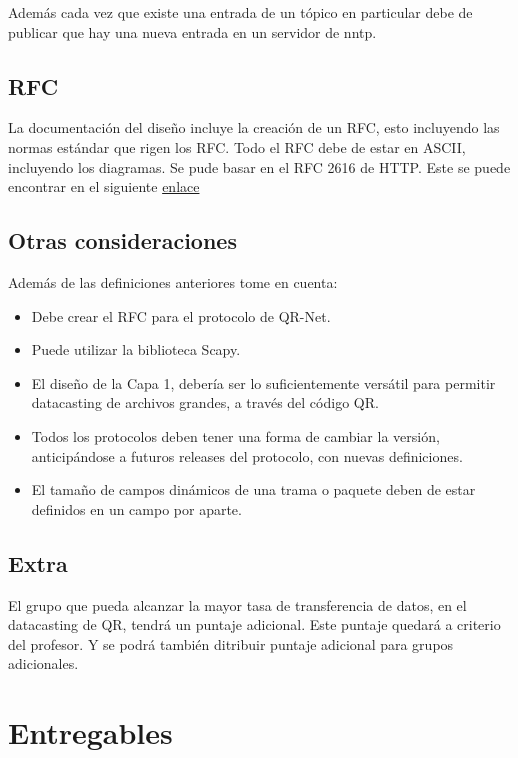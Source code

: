 \documentclass[11pt,a4paper]{scrartcl}			%
\providecommand{\tightlist}{%
          \setlength{\itemsep}{0pt}\setlength{\parskip}{0pt}}
\begin{document}
\begin{multicols*}{2}
Además cada vez que existe una entrada de un tópico en particular debe
de publicar que hay una nueva entrada en un servidor de nntp.

\subsection{RFC}\label{rfc}

La documentación del diseño incluye la creación de un RFC, esto
incluyendo las normas estándar que rigen los RFC. Todo el RFC debe de
estar en ASCII, incluyendo los diagramas. Se pude basar en el RFC 2616
de HTTP. Este se puede encontrar en el siguiente
\href{http://www.w3.org/Protocols/rfc2616/rfc2616.txt}{enlace}

\subsection{Otras consideraciones}\label{otras-consideraciones}

Además de las definiciones anteriores tome en cuenta:

\begin{itemize}
\tightlist
\item
  Debe crear el RFC para el protocolo de QR-Net.
\item
  Puede utilizar la biblioteca Scapy.
\item
  El diseño de la Capa 1, debería ser lo suficientemente versátil para
  permitir datacasting de archivos grandes, a través del código QR.
\item
  Todos los protocolos deben tener una forma de cambiar la versión,
  anticipándose a futuros releases del protocolo, con nuevas
  definiciones.
\item
  El tamaño de campos dinámicos de una trama o paquete deben de estar
  definidos en un campo por aparte.
\end{itemize}

\subsection{Extra}\label{extra}

El grupo que pueda alcanzar la mayor tasa de transferencia de datos, en
el datacasting de QR, tendrá un puntaje adicional. Este puntaje quedará
a criterio del profesor. Y se podrá también ditribuir puntaje adicional
para grupos adicionales.

\section{Entregables}\label{entregables}


\end{multicols*}
\end{document}
